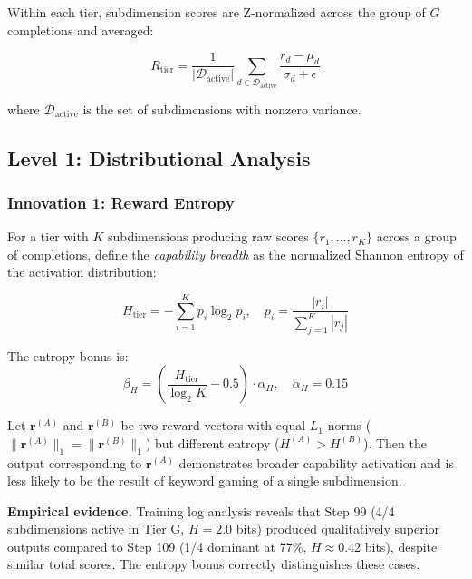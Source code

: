 \documentclass{article}
\begin{document}
Within each tier, subdimension scores are Z-normalized across the group of $G$ completions and averaged:

\begin{equation}
    R_{\text{tier}} = \frac{1}{|\mathcal{D}_{\text{active}}|} \sum_{d \in \mathcal{D}_{\text{active}}} \frac{r_d - \mu_d}{\sigma_d + \epsilon}
\end{equation}

where $\mathcal{D}_{\text{active}}$ is the set of subdimensions with nonzero variance.

\subsection{Level 1: Distributional Analysis}
\label{sec:entropy}

\subsubsection{Innovation 1: Reward Entropy}

\begin{definition}
For a tier with $K$ subdimensions producing raw scores $\{r_1, \ldots, r_K\}$ across a group of completions, define the \emph{capability breadth} as the normalized Shannon entropy of the activation distribution:

\begin{equation}
    H_{\text{tier}} = -\sum_{i=1}^{K} p_i \log_2 p_i, \quad p_i = \frac{|r_i|}{\sum_{j=1}^{K} |r_j|}
\end{equation}

The entropy bonus is:
\begin{equation}
    \beta_H = \left(\frac{H_{\text{tier}}}{\log_2 K} - 0.5\right) \cdot \alpha_H, \quad \alpha_H = 0.15
\end{equation}
\end{definition}

\begin{theorem}
Let $\mathbf{r}^{(A)}$ and $\mathbf{r}^{(B)}$ be two reward vectors with equal $L_1$ norms ($\|\mathbf{r}^{(A)}\|_1 = \|\mathbf{r}^{(B)}\|_1$) but different entropy ($H^{(A)} > H^{(B)}$). Then the output corresponding to $\mathbf{r}^{(A)}$ demonstrates broader capability activation and is less likely to be the result of keyword gaming of a single subdimension.
\end{theorem}

\textbf{Empirical evidence.} Training log analysis reveals that Step 99 (4/4 subdimensions active in Tier G, $H = 2.0$ bits) produced qualitatively superior outputs compared to Step 109 (1/4 dominant at 77\%, $H \approx 0.42$ bits), despite similar total scores. The entropy bonus correctly distinguishes these cases.
\end{document}
